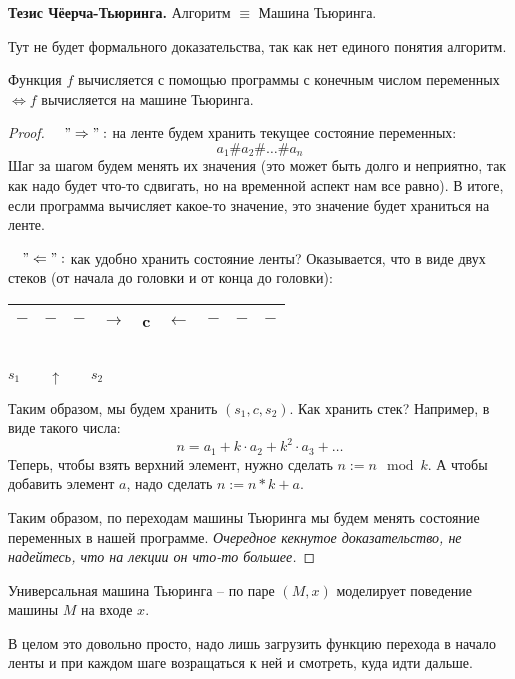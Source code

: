 \textbf{Тезис Чёерча-Тьюринга.} Алгоритм $\equiv$ Машина Тьюринга.

Тут не будет формального доказательства, так как нет единого понятия алгоритм.

\begin{theorem}
    Функция $f$ вычисляется с помощью программы с конечным числом переменных $\Longleftrightarrow f$ вычисляется на машине Тьюринга. 
\end{theorem}
\begin{proof} \quad

    $\quad "\Rightarrow":$ на ленте будем хранить текущее состояние переменных: \[ a_1 \# a_2 \# \dots \# a_n\]
    \quad Шаг за шагом будем менять их значения (это может быть долго и неприятно, так как надо будет что-то сдвигать, но на временной аспект нам все равно). В итоге, если программа вычисляет какое-то значение, это значение будет храниться на ленте.
    
    $\quad "\Leftarrow":$ как удобно хранить состояние ленты? Оказывается, что в виде двух стеков (от начала до головки и от конца до головки): 
    \begin{center}
        \begin{tabular}{|c|c|c|c|c|c|c|c|c|}
            \hline
            $-$ & $-$ & $-$ & $\rightarrow$ & c & $\leftarrow$ & $-$ & $-$ & $-$ \\
            \hline
        \end{tabular}\\
        $s_1 \quad\quad \uparrow \quad\quad s_2$ 
    \end{center}
    \quad Таким образом, мы будем хранить $(s_1, c, s_2)$. Как хранить стек? Например, в виде такого числа: \[ n = a_1 + k \cdot a_2 + k^2 \cdot a_3 + \dots \]
    \quad Теперь, чтобы взять верхний элемент, нужно сделать $n := n \mod k$. А чтобы добавить элемент $a$, надо сделать $n := n * k + a$.

    \quad Таким образом, по переходам машины Тьюринга мы будем менять состояние переменных в нашей программе. \textit{Очередное кекнутое доказательство, не надейтесь, что на лекции он что-то большее.}
\end{proof}

\begin{conj}
    Универсальная машина Тьюринга -- по паре $(M, x)$ моделирует поведение машины $M$ на входе $x$.
\end{conj}
В целом это довольно просто, надо лишь загрузить функцию перехода в начало ленты и при каждом шаге возращаться к ней и смотреть, куда идти дальше.

